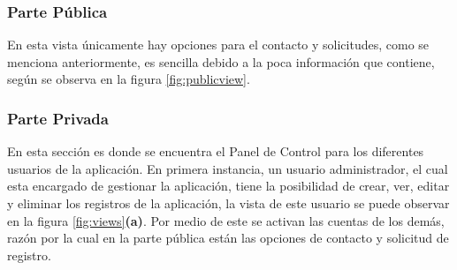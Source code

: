 

\begin{frame}

\subsubsection{Parte Pública}

En esta vista únicamente hay opciones para el contacto y solicitudes, como se menciona anteriormente, es sencilla debido a la poca información que contiene, según se observa en la figura \ref{fig:publicview}.


\subsubsection{Parte Privada}

En esta sección es donde se encuentra el Panel de Control para los diferentes usuarios de la aplicación. En primera instancia, un usuario administrador, el cual esta encargado de gestionar la aplicación, tiene la posibilidad de crear, ver, editar y eliminar los registros de la aplicación, la vista de este usuario se puede observar en la figura \ref{fig:views}\textbf{(a)}. Por medio de este se activan las cuentas de los demás, razón por la cual en la parte pública están las opciones de contacto y solicitud de registro.\\


\end{frame}

